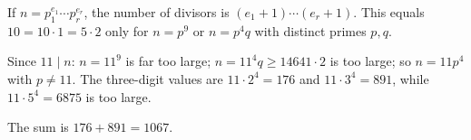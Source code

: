 If $n=p_1^{e_1}\cdots p_r^{e_r}$, the number of divisors is $(e_1+1)\cdots(e_r+1)$. This equals $10=10\cdot1=5\cdot2$ only for $n=p^9$ or $n=p^4q$ with distinct primes $p,q$.

Since $11\mid n$: $n=11^9$ is far too large; $n=11^4q\ge14641\cdot2$ is too large; so $n=11p^4$ with $p\ne11$. The three-digit values are $11\cdot2^4=176$ and $11\cdot3^4=891$, while $11\cdot5^4=6875$ is too large.

The sum is $176+891=\boxed{1067}$.
